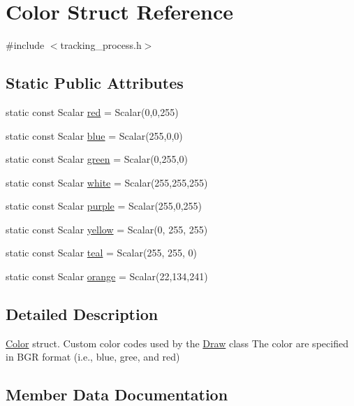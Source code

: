 \hypertarget{struct_color}{}\section{Color Struct Reference}
\label{struct_color}


{\ttfamily \#include $<$tracking\+\_\+process.\+h$>$}

\subsection*{Static Public Attributes}
\begin{DoxyCompactItemize}
\item 
static const Scalar \hyperlink{struct_color_a3a719c8fa99595a064873ff3735b191e}{red} = Scalar(0,0,255)
\item 
static const Scalar \hyperlink{struct_color_ad65c713a1bfaa62c7c222379cd9591c9}{blue} = Scalar(255,0,0)
\item 
static const Scalar \hyperlink{struct_color_a748ac4a0b884a70627083dc7c03318f5}{green} = Scalar(0,255,0)
\item 
static const Scalar \hyperlink{struct_color_acc387213feb8880e8fa61c306f6788ae}{white} = Scalar(255,255,255)
\item 
static const Scalar \hyperlink{struct_color_aa1490dd2cb61e17be61287c61bb41cb7}{purple} = Scalar(255,0,255)
\item 
static const Scalar \hyperlink{struct_color_a2280055de8d620e851a81f6e2603b5ad}{yellow} = Scalar(0, 255, 255)
\item 
static const Scalar \hyperlink{struct_color_aaf469a242ca8e42847a9886f90d498b6}{teal} = Scalar(255, 255, 0)
\item 
static const Scalar \hyperlink{struct_color_ad6a2ba9ca4e4fec8c23a5263abe2b8f7}{orange} = Scalar(22,134,241)
\end{DoxyCompactItemize}


\subsection{Detailed Description}
\hyperlink{struct_color}{Color} struct. Custom color codes used by the \hyperlink{class_draw}{Draw} class The color are specified in B\+GR format (i.\+e., blue, gree, and red) 

\subsection{Member Data Documentation}
